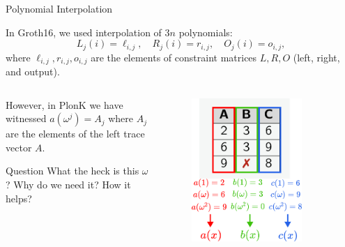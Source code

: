 \documentclass{zkdl-presentation-template}
\begin{document}
    \begin{frame}{Polynomial Interpolation}
        \begin{example}
            In Groth16, we used interpolation of $3n$ polynomials:
            \begin{equation*}
                L_j(i) = \ell_{i,j}, \quad R_j(i) = r_{i,j}, \quad O_j(i) = o_{i,j},
            \end{equation*}
            where $\ell_{i,j}, r_{i,j}, o_{i,j}$ are the elements of constraint
            matrices $L, R, O$ (left, right, and output).\pause
        \end{example}

        \begin{columns}
            \begin{column}{0.65\textwidth}
                However, in PlonK we have witnessed $a(\omega^j) = A_j$ where
                $A_j$ are the elements of the left trace vector $A$.

                \begin{alertblock}{Question}
                    What the heck is this $\omega$? Why do we 
                    need it? How it helps?
                \end{alertblock}
            \end{column}
            \begin{column}{0.35\textwidth}
                \begin{figure}
                    \centering
                    \includegraphics[width=0.8\textwidth]{images/lecture_13/plonk_table.pdf}
                \end{figure}
            \end{column}
        \end{columns}
    \end{frame}
\end{document}
